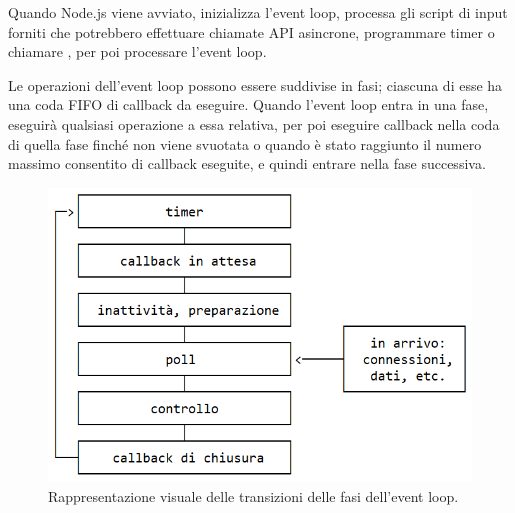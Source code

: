 Quando Node.js viene avviato, inizializza l'event loop, processa gli script di input forniti che potrebbero effettuare chiamate API asincrone, programmare timer o chiamare , per poi processare l'event loop.\cite{node.js-eventloop}

Le operazioni dell'event loop possono essere suddivise in fasi; ciascuna di esse ha una coda FIFO di callback da eseguire. Quando l'event loop entra in una fase, eseguirà qualsiasi operazione a essa relativa, per poi eseguire callback nella coda di quella fase finché non viene svuotata o quando è stato raggiunto il numero massimo consentito di callback eseguite, e quindi entrare nella fase successiva.\cite{node.js-eventloop}

\begin{figure}[h]
\begin{center}
  \includegraphics[width=0.8\linewidth]{res/EventLoop.png}
  \caption[Rappresentazione visuale delle transizioni delle fasi dell'event loop.]{Rappresentazione visuale delle transizioni delle fasi dell'event loop.\protect\cite{node.js-eventloop}}
  \label{fig:EventLoop}
\end{center}
\end{figure}

